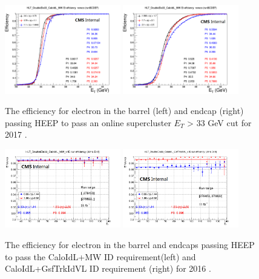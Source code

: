 \begin{figure}[h!]
\begin{center}
\includegraphics[width=0.45\textwidth]{figures/Zprime/2017/trigger/eff_DouEle33_Et_barrel.png}
\includegraphics[width=0.45\textwidth]{figures/Zprime/2017/trigger/eff_DouEle33_Et_endcap.png}
\caption{The efficiency for electron in the barrel (left) and endcap (right) passing HEEP to pass an online supercluster $E_{T}$ > 33 GeV cut for 2017 \cite{CMS-AN-2018-021}.}
\label{fig:HLT_turnon_2017}
\end{center}
\end{figure}

\begin{figure}[h!]
\begin{center}
\includegraphics[width=0.45\textwidth]{figures/Zprime/2016/trigger/effMW1_DoubleEle33_SingleElectron_ID_matchedMethod.png}
\includegraphics[width=0.45\textwidth]{figures/Zprime/2016/trigger/eff1_DoubleEle33_SingleElectron_ID_matchedMethod.png}
\caption{The efficiency for electron in the barrel and endcaps passing HEEP to pass the CaloIdL+MW ID requirement(left) and CaloIdL+GsfTrkIdVL ID requirement (right) for 2016 \cite{CMS-AN-2016-404}.}
\label{fig:HLT_ID_2016}
\end{center}
\end{figure}

